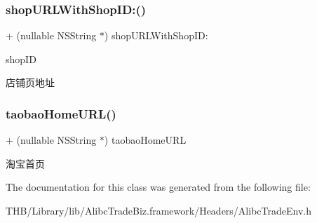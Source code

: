 \subsubsection{\texorpdfstring{shop\+U\+R\+L\+With\+Shop\+I\+D\+:()}{shopURLWithShopID:()}}
{\footnotesize\ttfamily + (nullable N\+S\+String $\ast$) shop\+U\+R\+L\+With\+Shop\+I\+D\+: \begin{DoxyParamCaption}\item[{(nonnull N\+S\+String $\ast$)}]{shop\+ID }\end{DoxyParamCaption}}

店铺页地址 \mbox{\label{interface_alibc_trade_env_a716e293787742d725d9d52cd525c56b0}} 
\subsubsection{\texorpdfstring{taobao\+Home\+U\+R\+L()}{taobaoHomeURL()}}
{\footnotesize\ttfamily + (nullable N\+S\+String $\ast$) taobao\+Home\+U\+RL \begin{DoxyParamCaption}{ }\end{DoxyParamCaption}}

淘宝首页 

The documentation for this class was generated from the following file\+:\begin{DoxyCompactItemize}
\item 
T\+H\+B/\+Library/lib/\+Alibc\+Trade\+Biz.\+framework/\+Headers/Alibc\+Trade\+Env.\+h\end{DoxyCompactItemize}
